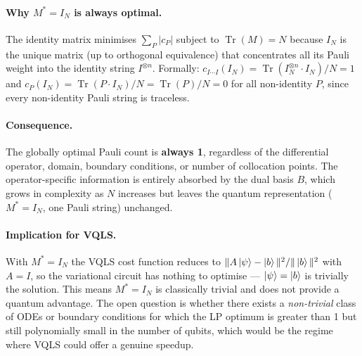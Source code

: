 \documentclass{article}
\begin{document}
\paragraph{Why $M^* = I_N$ is always optimal.}
The identity matrix minimises $\sum_P |c_P|$ subject to $\operatorname{Tr}(M)=N$
because $I_N$ is the unique matrix (up to orthogonal equivalence) that concentrates
all its Pauli weight into the identity string $I^{\otimes n}$.  Formally:
$c_{I\cdots I}(I_N) = \operatorname{Tr}(I_N^{\otimes n}\cdot I_N)/N = 1$ and
$c_P(I_N) = \operatorname{Tr}(P\cdot I_N)/N = \operatorname{Tr}(P)/N = 0$ for all
non-identity $P$, since every non-identity Pauli string is traceless.

\paragraph{Consequence.}
The globally optimal Pauli count is \textbf{always 1}, regardless of the
differential operator, domain, boundary conditions, or number of collocation
points.  The operator-specific information is entirely absorbed by the dual
basis $B$, which grows in complexity as $N$ increases but leaves the quantum
representation ($M^* = I_N$, one Pauli string) unchanged.

\paragraph{Implication for VQLS.}
With $M^* = I_N$ the VQLS cost function reduces to
$\|A\ket{\psi} - \ket{b}\|^2 / \|\ket{b}\|^2$ with $A = I$, so the variational
circuit has nothing to optimise — $\ket{\psi} = \ket{b}$ is trivially the solution.
This means $M^* = I_N$ is classically trivial and does not provide a quantum
advantage.  The open question is whether there exists a \emph{non-trivial}
class of ODEs or boundary conditions for which the LP optimum is greater than 1
but still polynomially small in the number of qubits, which would be the regime
where VQLS could offer a genuine speedup.
\end{document}

